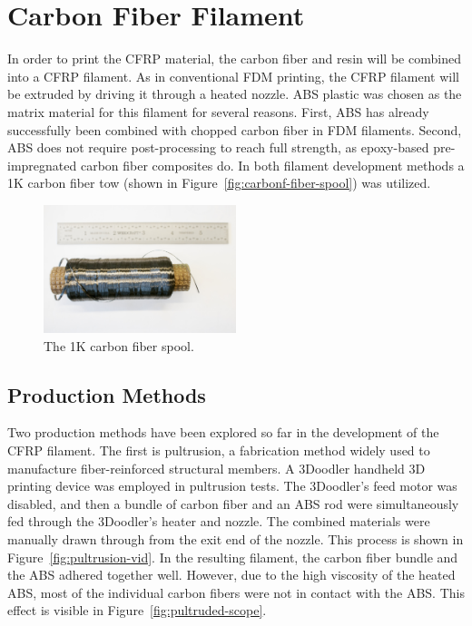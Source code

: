 \section{Carbon Fiber Filament}

\indent

In order to print the CFRP material, the carbon fiber and resin will be combined into a CFRP filament. As in conventional FDM printing, the CFRP filament will be extruded by driving it through a heated nozzle. ABS plastic was chosen as the matrix material for this filament for several reasons. First, ABS has already successfully been combined with chopped carbon fiber in FDM filaments. Second, ABS does not require post-processing to reach full strength, as epoxy-based pre-impregnated carbon fiber composites do. In both filament development methods a 1K carbon fiber tow (shown in Figure~\ref{fig:carbonf-fiber-spool}) was utilized.\\

\begin{figure}[htp]
    \centering
    \includegraphics[width=0.5\textwidth]{./figures/carbon-fiber-spool}
    \caption{The 1K carbon fiber spool.}
    \label{fig:carbon-fiber-spool}
\end{figure}

\subsection{Production Methods}

\indent

Two production methods have been explored so far in the development of the CFRP filament. The first is pultrusion, a fabrication method widely used to manufacture fiber-reinforced structural members. A 3Doodler handheld 3D printing device was employed in pultrusion tests. The 3Doodler's feed motor was disabled, and then a bundle of carbon fiber and an ABS rod were simultaneously fed through the 3Doodler's heater and nozzle. The combined materials were manually drawn through from the exit end of the nozzle. This process is shown in Figure~\ref{fig:pultrusion-vid}. In the resulting filament, the carbon fiber bundle and the ABS adhered together well. However, due to the high viscosity of the heated ABS, most of the individual carbon fibers were not in contact with the ABS. This effect is visible in Figure~\ref{fig:pultruded-scope}.\\


